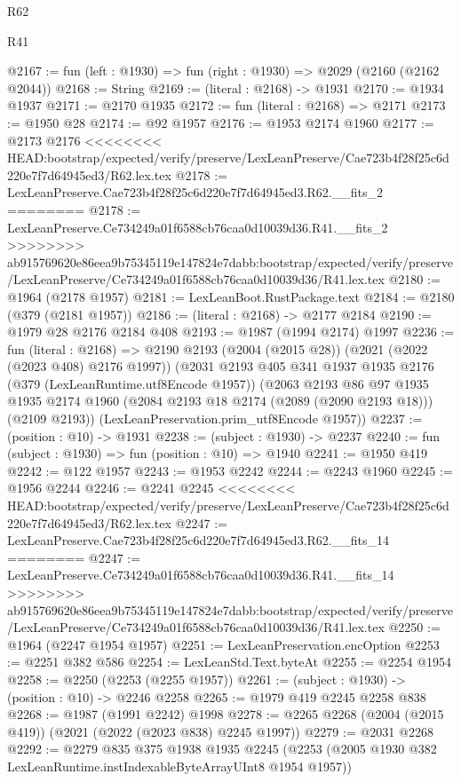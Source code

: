 \begin{lexlean}{R62}
\begin{lexlean}{R41}
\begin{coremodule}
{{{{{{{{{{{{{{{{{{{{{{{{{{{{{{{{{{{{{{{{{{{{{{{{{{{{{{{{{{{{{{{{{{{{{{{{{{{{{{{{{{{{{{{@2167 := fun (left : @1930) => fun (right : @1930) => @2029 (@2160 (@2162 @2044))
@2168 := String
@2169 := (literal : @2168) -> @1931
@2170 := @1934 @1937
@2171 := @2170 @1935
@2172 := fun (literal : @2168) => @2171
@2173 := @1950 @28
@2174 := @92 @1957
@2176 := @1953 @2174 @1960
@2177 := @2173 @2176
<<<<<<<< HEAD:bootstrap/expected/verify/preserve/LexLeanPreserve/Cae723b4f28f25c6d220e7f7d64945ed3/R62.lex.tex
@2178 := LexLeanPreserve.Cae723b4f28f25c6d220e7f7d64945ed3.R62.__fits_2
========
@2178 := LexLeanPreserve.Ce734249a01f6588cb76caa0d10039d36.R41.__fits_2
>>>>>>>> ab915769620e86eea9b75345119e147824e7dabb:bootstrap/expected/verify/preserve/LexLeanPreserve/Ce734249a01f6588cb76caa0d10039d36/R41.lex.tex
@2180 := @1964 (@2178 @1957)
@2181 := LexLeanBoot.RustPackage.text
@2184 := @2180 (@379 (@2181 @1957))
@2186 := (literal : @2168) -> @2177 @2184
@2190 := @1979 @28 @2176 @2184 @408
@2193 := @1987 (@1994 @2174) @1997
@2236 := fun (literal : @2168) =>
  @2190
    @2193
    (@2004 (@2015 @28))
    (@2021 (@2022 (@2023 @408) @2176 @1997))
    (@2031
      @2193
      @405
      @341
      @1937
      @1935
      @2176
      (@379 (LexLeanRuntime.utf8Encode @1957))
      (@2063
        @2193
        @86
        @97
        @1935
        @1935
        @2174
        @1960
        (@2084 @2193 @18 @2174 (@2089 (@2090 @2193 @18)))
        (@2109 @2193))
      (LexLeanPreservation.prim_utf8Encode @1957))
@2237 := (position : @10) -> @1931
@2238 := (subject : @1930) -> @2237
@2240 := fun (subject : @1930) => fun (position : @10) => @1940
@2241 := @1950 @419
@2242 := @122 @1957
@2243 := @1953 @2242
@2244 := @2243 @1960
@2245 := @1956 @2244
@2246 := @2241 @2245
<<<<<<<< HEAD:bootstrap/expected/verify/preserve/LexLeanPreserve/Cae723b4f28f25c6d220e7f7d64945ed3/R62.lex.tex
@2247 := LexLeanPreserve.Cae723b4f28f25c6d220e7f7d64945ed3.R62.__fits_14
========
@2247 := LexLeanPreserve.Ce734249a01f6588cb76caa0d10039d36.R41.__fits_14
>>>>>>>> ab915769620e86eea9b75345119e147824e7dabb:bootstrap/expected/verify/preserve/LexLeanPreserve/Ce734249a01f6588cb76caa0d10039d36/R41.lex.tex
@2250 := @1964 (@2247 @1954 @1957)
@2251 := LexLeanPreservation.encOption
@2253 := @2251 @382 @586
@2254 := LexLeanStd.Text.byteAt
@2255 := @2254 @1954
@2258 := @2250 (@2253 (@2255 @1957))
@2261 := (subject : @1930) -> (position : @10) -> @2246 @2258
@2265 := @1979 @419 @2245 @2258 @838
@2268 := @1987 (@1991 @2242) @1998
@2278 := @2265 @2268 (@2004 (@2015 @419)) (@2021 (@2022 (@2023 @838) @2245 @1997))
@2279 := @2031 @2268
@2292 := @2279
    @835
    @375
    @1938
    @1935
    @2245
    (@2253 (@2005 @1930 @382 LexLeanRuntime.instIndexableByteArrayUInt8 @1954 @1957))
}}}}}}}}}}}}}}}}}}}}}}}}}}}}}}}}}}}}}}}}}}}}}}}}}}}}}}}}}}}}}}}}}}}}}}}}}}}}}}}}}}}}}}}
\end{coremodule}
\end{lexlean}
\end{lexlean}
